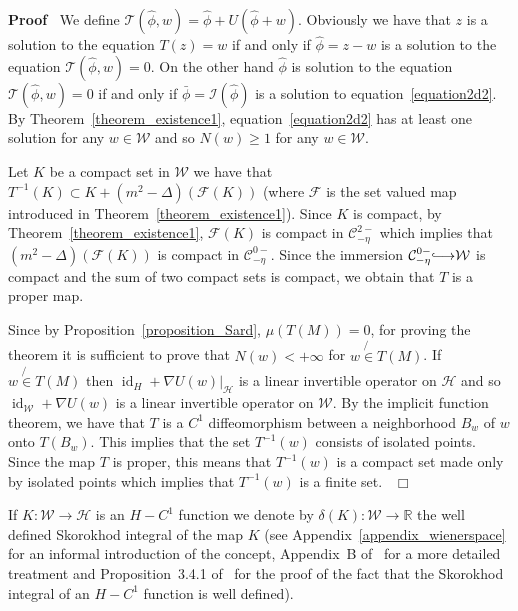 \documentclass[a4paper,10pt]{article}
\newcommand{\longhookrightarrow}{{\lhook\joinrel\relbar\joinrel\rightarrow}}
\newcommand{\nobracket}{}
\newcommand{\tmop}[1]{\ensuremath{\operatorname{#1}}}
\newenvironment{proof}{\noindent\textbf{Proof\ }}{\hspace*{\fill}$\Box$\medskip}
\begin{document}
\begin{proof}
  We define $\mathcal{T} (\hat{\phi}, w) = \hat{\phi} + U (\hat{\phi} + w)$.
  Obviously we have that $z$ is a solution to the equation $T (z) = w$ if and
  only if $\hat{\phi} = z - w$ is a solution to the equation $\mathcal{T}
  (\hat{\phi}, w) = 0$. On the other hand $\hat{\phi}$ is solution to the
  equation $\mathcal{T} (\hat{\phi}, w) = 0$ if and only if $\bar{\phi}
  =\mathcal{I} (\hat{\phi})$ is a solution to equation~{\eqref{equation2d2}}.
  By Theorem~\ref{theorem_existence1}, equation~{\eqref{equation2d2}} has at
  least one solution for any $w \in \mathcal{W}$ and so $N (w) \geqslant 1$
  for any $w \in \mathcal{W}$.
  
  Let $K$ be a compact set in $\mathcal{W}$ we have that $T^{- 1} (K) \subset
  K + (m^2 - \Delta) (\mathcal{F} (K))$ (where $\mathcal{F}$ is the set valued
  map introduced in Theorem~\ref{theorem_existence1}). Since $K$ is compact,
  by Theorem~\ref{theorem_existence1}, $\mathcal{F} (K)$ is compact in
  $\mathcal{C}^{2 -}_{- \eta}$ which implies that $(m^2 - \Delta) (\mathcal{F}
  (K))$ is compact in $\mathcal{C}^{0 -}_{- \eta}$. Since the immersion
  $\mathcal{C}^{0 -}_{- \eta} \longhookrightarrow \mathcal{W}$ is compact and
  the sum of two compact sets is compact, we obtain that $T$ is a proper map.
  
  Since by Proposition~\ref{proposition_Sard}, $\mu (T (M)) = 0$, for proving
  the theorem it is sufficient to prove that $N (w) < + \infty$ for $w
  \not{\in} T (M)$. If $w \not{\in} T (M)$ then $\tmop{id}_H + \nobracket
  \nabla U (w) |_{\mathcal{H}}$ is a linear invertible operator on
  $\mathcal{H}$ and so $\tmop{id}_{\mathcal{W}} + \nabla U (w)$ is a linear
  invertible operator on $\mathcal{W}$. By the implicit function theorem, we
  have that $T$ is a $C^1$ diffeomorphism between a neighborhood $B_w$ of $w$
  onto $T (B_w)$. This implies that the set $T^{- 1} (w)$ consists of isolated
  points. Since the map $T$ is proper, this means that $T^{- 1} (w)$ is a
  compact set made only by isolated points which implies that $T^{- 1} (w)$ is
  a finite set. \ 
\end{proof}

If $K : \mathcal{W} \rightarrow \mathcal{H}$ is an $H - C^1$ function we
denote by $\delta (K) : \mathcal{W} \rightarrow \mathbb{R}$ the well defined
Skorokhod integral of the map $K$ (see Appendix~\ref{appendix_wienerspace} for
an informal introduction of the concept, Appendix~B of~{\cite{Ustunel2000}}
for a more detailed treatment and Proposition~3.4.1 of~{\cite{Ustunel2000}}
for the proof of the fact that the Skorokhod integral of an $H - C^1$ function
is well defined).
\end{document}
